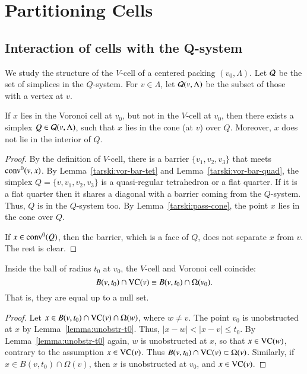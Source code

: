 \chapter{Partitioning Cells}%
    \label{sec:fine}

\section{Interaction of cells with the Q-system}

We study the structure of the $V$-cell of a centered packing $(v_0,\Lambda)$.
Let ${\mathcal Q}$ be the set of simplices
in the $Q$-system.  For $v\in\Lambda$, let ${\mathcal Q}(v,\Lambda)$ be the subset
of those with a vertex at $v$.



\begin{lemma} \label{lemma:voronoi-truncation-over-Q}
If $x$ lies in the  Voronoi cell at $v_0$, 
but not in the $V$-cell at $v_0$, then there exists a
simplex $Q\in{\mathcal Q}(v,\Lambda)$, such that $x$ lies in the cone (at $v$)
over $Q$. Moreover, $x$ does not lie in the interior of $Q$.
\end{lemma}

\begin{proof}
By
the definition of $V$-cell, there is a barrier $\{v_1,v_2,v_3\}$
that meets ${\operatorname{conv}}^0(v,x)$.  
By Lemma~\ref{tarski:vor-bar-tet}
and Lemma~\ref{tarski:vor-bar-quad},
the simplex $Q=\{v,v_1,v_2,v_3\}$ is a quasi-regular tetrahedron
or a flat quarter.  If it is a flat quarter then it shares a diagonal
with a barrier coming from the $Q$-system.  Thus, $Q$ is in
the $Q$-system too.  By Lemma~\ref{tarski:pass-cone}, the
point $x$ lies in the cone over $Q$.

If $x\in{\operatorname{conv}}^0(Q)$, then the barrier, which is a face
of $Q$, does not separate
$x$ from $v$.  The rest is clear.
\end{proof}



\begin{lemma}\label{lemma:VC-Omega}
Inside the ball of radius $t_0$ at $v_0$, the $V$-cell and
Voronoi cell coincide:
   $$B(v,t_0)\cap {\operatorname{VC}}(v) \equiv B(v,t_0)\cap \Omega(v_0).$$
That is, they are equal up to a null set.
\end{lemma}

\begin{proof} Let $x\in B(v,t_0)\cap {\operatorname{VC}}(v)\cap\Omega(w)$, where
$w\ne v$.  
The point $v_0$ is
unobstructed  at $x$ by Lemma~\ref{lemma:unobstr-t0}.  
Thus, $|x-w|< |x-v|\le t_0$.  By
Lemma~\ref{lemma:unobstr-t0} again, $w$ is unobstructed at $x$, so
that $x\in {\operatorname{VC}}(w)$, contrary to the assumption
$x\in{\operatorname{VC}}(v)$.  Thus $B(v,t_0)\cap{\operatorname{VC}}(v)\subset\Omega(v)$.
Similarly, if $x\in B(v,t_0)\cap \Omega(v)$, then $x$ is
unobstructed at $v_0$, and $x\in {\operatorname{VC}}(v)$.
\end{proof}

